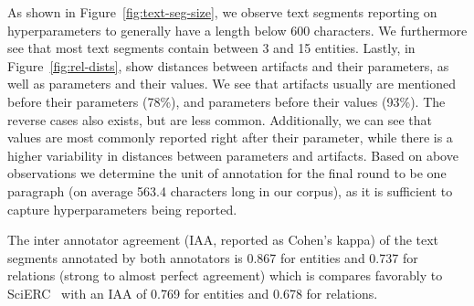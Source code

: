As shown in Figure~\ref{fig:text-seg-size}, we observe text segments reporting on hyperparameters to generally have a length below 600 characters. %
We furthermore see that most text segments contain between 3 and 15 entities. %
Lastly, in Figure~\ref{fig:rel-dists}, show distances between artifacts and their parameters, as well as parameters and their values. We see that artifacts usually are mentioned before their parameters (78\%), and parameters before their values (93\%). The reverse cases also exists, but are less common.
Additionally, we can see that values are most commonly reported right after their parameter, while there is a higher variability in distances between parameters and artifacts.
Based on above observations %
we determine the unit of annotation for the final round to be one paragraph (on average 563.4 characters long in our corpus), as it is sufficient to capture hyperparameters being reported.

The inter annotator agreement (IAA, reported as Cohen's kappa) of the text segments annotated by both annotators is 0.867 for entities and 0.737 for relations %
(strong to almost perfect agreement) which is compares favorably to SciERC~\cite{luan2018scierc} with an IAA of 0.769 for entities and 0.678 for relations.




